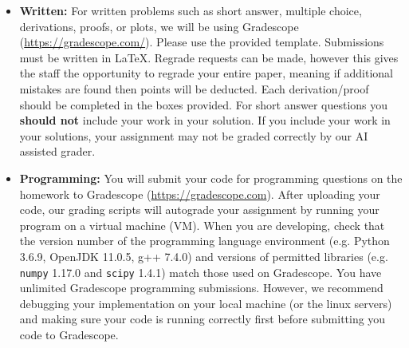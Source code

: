 \documentclass[11pt,addpoints,answers]{exam}
\begin{document}
\begin{itemize}
\begin{itemize}

    
    \item \textbf{Written:} For written problems such as short answer, multiple choice, derivations, proofs, or plots, we will be using Gradescope (\url{https://gradescope.com/}). Please use the provided template. Submissions must be written in LaTeX. Regrade requests can be made, however this gives the staff the opportunity to regrade your entire paper, meaning if additional mistakes are found then points will be deducted.
    Each derivation/proof should be completed in the boxes provided. For short answer questions you \textbf{should not} include your work in your solution.  If you include your work in your solutions, your assignment may not be graded correctly by our AI assisted grader.

    \item \textbf{Programming:} You will submit your code for programming questions on the homework to Gradescope (\url{https://gradescope.com}). After uploading your code, our grading scripts will autograde your assignment by running your program on a virtual machine (VM). When you are developing, check that the version number of the programming language environment (e.g. Python 3.6.9, OpenJDK 11.0.5, g++ 7.4.0) and versions of permitted libraries (e.g.  \texttt{numpy} 1.17.0 and \texttt{scipy} 1.4.1) match those used on Gradescope. You have unlimited Gradescope programming submissions. However, we recommend debugging your implementation on your local machine (or the linux servers) and making sure your code is running correctly first before submitting you code to Gradescope.


\end{itemize}
\end{itemize}
\end{document}

